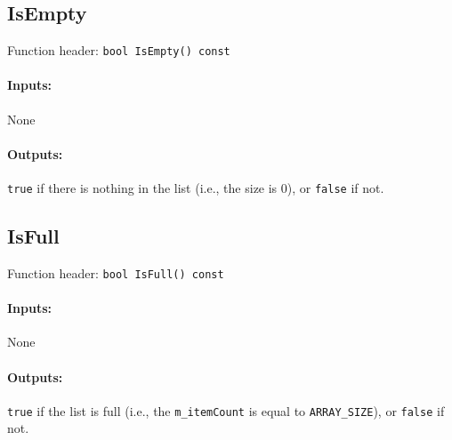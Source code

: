     \begin{framed}
    \subsection{IsEmpty}

    Function header: \texttt{bool    IsEmpty() const}

    \paragraph{Inputs:}
        None

    \paragraph{Outputs:}
        \texttt{true} if there is nothing in the list (i.e., the size is 0), or \texttt{false} if not.

    \end{framed}

    \newpage

    \begin{framed}
    \subsection{IsFull}

    Function header: \texttt{bool    IsFull() const}

    \paragraph{Inputs:}
        None

    \paragraph{Outputs:}
        \texttt{true} if the list is full (i.e., the \texttt{m\_itemCount} is equal to \texttt{ARRAY\_SIZE}),
        or \texttt{false} if not.
        
    \end{framed}

